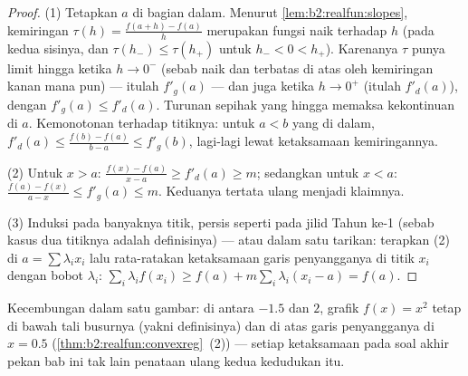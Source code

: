 \begin{proof}
(1) Tetapkan $a$ di bagian dalam. Menurut \cref{lem:b2:realfun:slopes},
kemiringan $\tau(h) = \frac{f(a + h) - f(a)}{h}$ merupakan fungsi naik
terhadap $h$ (pada kedua sisinya, dan $\tau(h_-) \leq \tau(h_+)$ untuk
$h_- < 0 < h_+$). Karenanya $\tau$ punya limit hingga ketika $h \to 0^-$
(sebab naik dan terbatas di atas oleh kemiringan kanan mana pun) ---
itulah $f'_g(a)$ --- dan juga ketika $h \to 0^+$ (itulah $f'_d(a)$),
dengan $f'_g(a) \leq f'_d(a)$. Turunan sepihak yang hingga memaksa
kekontinuan di $a$. Kemonotonan terhadap titiknya: untuk $a < b$ yang di
dalam, $f'_d(a) \leq \frac{f(b) - f(a)}{b - a} \leq f'_g(b)$, lagi-lagi
lewat ketaksamaan kemiringannya.

(2) Untuk $x > a$: $\frac{f(x) - f(a)}{x - a} \geq f'_d(a) \geq m$;
sedangkan untuk $x < a$: $\frac{f(a) - f(x)}{a - x} \leq f'_g(a) \leq
m$. Keduanya tertata ulang menjadi klaimnya.

(3) Induksi pada banyaknya titik, persis seperti pada jilid Tahun ke-1
(sebab kasus dua titiknya adalah definisinya) --- atau dalam satu
tarikan: terapkan (2) di $a = \sum\lambda_i x_i$ lalu rata-ratakan
ketaksamaan garis penyangganya di titik $x_i$ dengan bobot $\lambda_i$:
$\sum_i \lambda_i f(x_i) \geq f(a) + m\sum_i\lambda_i(x_i - a) = f(a)$.
\end{proof}

\begin{omfigure}

{\small Kecembungan dalam satu gambar: di antara $-1.5$ dan $2$,
grafik $f(x) = x^2$ tetap di bawah tali busurnya (yakni definisinya) dan
di atas garis penyangganya di $x = 0.5$
(\cref{thm:b2:realfun:convexreg}~(2)) --- setiap ketaksamaan pada soal
akhir pekan bab ini tak lain penataan ulang kedua kedudukan
itu.}
\end{omfigure}


